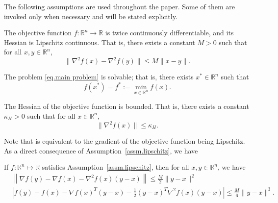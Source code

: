 \documentclass[moor,sglanonrev]{informs4}
\begin{document}
The following assumptions are used throughout the paper. Some of them are invoked only when necessary and will be stated explicitly.
\begin{assumption}
    \label{assm.lipschitz}
    The objective function $f: \mathbb{R}^n \to \mathbb{R}$ is twice continuously differentiable, and its Hessian is Lipschitz continuous. That is, there exists a constant $M > 0$ such that for all $x, y \in \mathbb{R}^n$,
    \begin{equation}
        \label{eq.main assm}
        \|\nabla^2 f(x) - \nabla^2 f(y)\| \leq M \|x - y\|. \end{equation}
\end{assumption}
\begin{assumption}
    \label{assm.solvable}
    The problem \eqref{eq.main problem} is solvable; that is, there exists $x^* \in \mathbb{R}^n$ such that
    \begin{equation*}
        f(x^*) = f^*:= \min_{x \in \mathbb{R}^n} f(x).
    \end{equation*}
\end{assumption}
\begin{assumption}
    \label{assm.bounded hessian}
    The Hessian of the objective function is bounded. That is, there exists a constant $\kappa_H > 0$ such that for all $x \in \mathbb{R}^n$, \begin{equation}
        \label{eq.bounded hessian}
        \|\nabla^2 f(x)\| \leq \kappa_H.
    \end{equation}
\end{assumption}
{\color{red} Note that  is equivalent to the gradient of the objective function being Lipschitz.} 
As a direct consequence of Assumption~\ref{assm.lipschitz}, we have
\begin{lemma}\label{lem.lipschitz}
    If \(f:\mathbb{R}^n \mapsto \mathbb{R}\) satisfies Assumption~\ref{assm.lipschitz}, then for all \(x,y\in \mathbb{R}^n\), we have
    \begin{subequations}
        \begin{align}
            \label{eq.first-order exp}
             & \left\|\nabla f(y)-\nabla f(x)-\nabla^{2} f(x)(y-x)\right\|                       \leq \frac{M}{2}\|y-x\|^{2}  \\
            \label{eq.second-order exp}
             & \left|f(y)-f(x)-\nabla f(x)^T(y-x)-\frac{1}{2}(y-x)^T\nabla^{2} f(x)(y-x)\right|  \leq \frac{M}{6}\|y-x\|^{3}.
        \end{align}
    \end{subequations}
\end{lemma}
\end{document}
